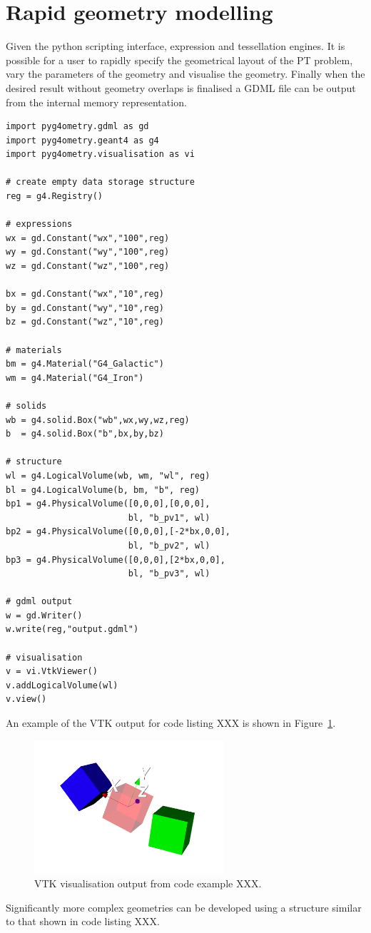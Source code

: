 \documentclass[final,5p,times,twocolumn]{elsarticle}
\begin{document}
\section{Rapid geometry modelling}
Given the python scripting interface, expression  and tessellation engines. It is possible for a user to rapidly specify the geometrical layout of the PT problem, vary 
the parameters of the geometry and visualise the geometry. Finally when the desired result without geometry overlaps is finalised a GDML file can be output
from the internal memory representation. 

{\small
\begin{verbatim}
import pyg4ometry.gdml as gd
import pyg4ometry.geant4 as g4
import pyg4ometry.visualisation as vi

# create empty data storage structure
reg = g4.Registry()

# expressions 
wx = gd.Constant("wx","100",reg)
wy = gd.Constant("wy","100",reg)
wz = gd.Constant("wz","100",reg)

bx = gd.Constant("wx","10",reg)
by = gd.Constant("wy","10",reg)
bz = gd.Constant("wz","10",reg)

# materials
bm = g4.Material("G4_Galactic") 
wm = g4.Material("G4_Iron") 

# solids
wb = g4.solid.Box("wb",wx,wy,wz,reg)
b  = g4.solid.Box("b",bx,by,bz)

# structure 
wl = g4.LogicalVolume(wb, wm, "wl", reg)
bl = g4.LogicalVolume(b, bm, "b", reg)
bp1 = g4.PhysicalVolume([0,0,0],[0,0,0], 
                        bl, "b_pv1", wl) 
bp2 = g4.PhysicalVolume([0,0,0],[-2*bx,0,0], 
                        bl, "b_pv2", wl)  
bp3 = g4.PhysicalVolume([0,0,0],[2*bx,0,0], 
                        bl, "b_pv3", wl) 
                        
# gdml output
w = gd.Writer()
w.write(reg,"output.gdml")

# visualisation 
v = vi.VtkViewer()
v.addLogicalVolume(wl)
v.view()
\end{verbatim}
}

An example of the VTK output for code listing XXX is shown in Figure~\ref{fig:rapidModellingExample}.
\begin{figure}[htbp]
\begin{center}
\includegraphics[width=7cm]{./diagrams/rapidModelling.pdf}
\caption{VTK visualisation output from code example XXX.}
\label{fig:rapidModellingExample}
\end{center}
\end{figure}
Significantly more complex geometries can be developed using a structure similar to that shown in code listing XXX.  
\end{document}
